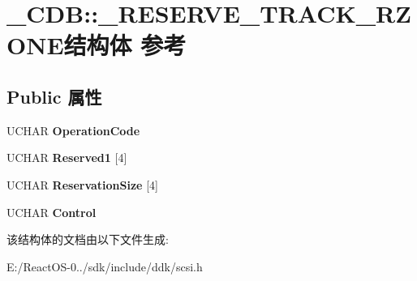 \hypertarget{struct___c_d_b_1_1___r_e_s_e_r_v_e___t_r_a_c_k___r_z_o_n_e}{}\section{\+\_\+\+C\+DB\+:\+:\+\_\+\+R\+E\+S\+E\+R\+V\+E\+\_\+\+T\+R\+A\+C\+K\+\_\+\+R\+Z\+O\+N\+E结构体 参考}
\label{struct___c_d_b_1_1___r_e_s_e_r_v_e___t_r_a_c_k___r_z_o_n_e}
\subsection*{Public 属性}
\begin{DoxyCompactItemize}
\item 
\mbox{\label{struct___c_d_b_1_1___r_e_s_e_r_v_e___t_r_a_c_k___r_z_o_n_e_a750498773020677e5033e6fa3617e4f6}} 
U\+C\+H\+AR {\bfseries Operation\+Code}
\item 
\mbox{\label{struct___c_d_b_1_1___r_e_s_e_r_v_e___t_r_a_c_k___r_z_o_n_e_a3986dda7bc01c551d2c41f61a91f0e46}} 
U\+C\+H\+AR {\bfseries Reserved1} \mbox{[}4\mbox{]}
\item 
\mbox{\label{struct___c_d_b_1_1___r_e_s_e_r_v_e___t_r_a_c_k___r_z_o_n_e_a7d51612108f6ef1ad01fe83ffb70f4a8}} 
U\+C\+H\+AR {\bfseries Reservation\+Size} \mbox{[}4\mbox{]}
\item 
\mbox{\label{struct___c_d_b_1_1___r_e_s_e_r_v_e___t_r_a_c_k___r_z_o_n_e_aa3cf4e9e7925b8c3104e6ea5aa51b14c}} 
U\+C\+H\+AR {\bfseries Control}
\end{DoxyCompactItemize}


该结构体的文档由以下文件生成\+:\begin{DoxyCompactItemize}
\item 
E\+:/\+React\+O\+S-\/0../sdk/include/ddk/scsi.\+h\end{DoxyCompactItemize}
